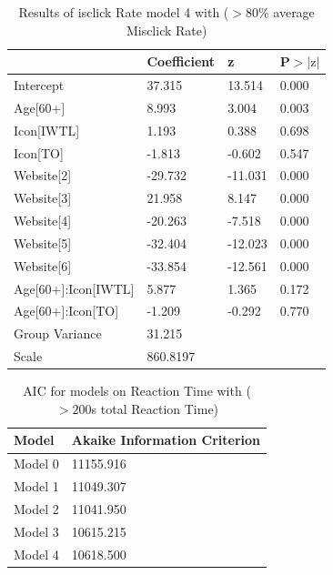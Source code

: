 \documentclass[12pt,twoside]{reedthesis}
\begin{document}
\begin{table}[h!]
        \centering
        \begin{tabular}{| p{5cm} | p{2.5cm} | p{2.5cm} | p{2.5cm} |}
            \hline
            & Coefficient & z & P$>|\text{z}|$\\
            \hline
            Intercept & 37.315 & 13.514 & 0.000\\
            \hline
            Age[60+] & 8.993 & 3.004 & 0.003\\
            \hline
            Icon[IWTL] & 1.193 & 0.388 & 0.698\\
            \hline
            Icon[TO] & -1.813 & -0.602 & 0.547\\
            \hline
            Website[2] & -29.732 & -11.031 & 0.000\\
            \hline
            Website[3] & 21.958 & 8.147 & 0.000\\
            \hline
            Website[4] & -20.263 & -7.518 & 0.000\\
            \hline
            Website[5] & -32.404 & -12.023 & 0.000\\
            \hline
            Website[6] & -33.854 & -12.561 & 0.000\\
            \hline
            Age[60+]:Icon[IWTL] & 5.877 & 1.365 & 0.172\\
            \hline
            Age[60+]:Icon[TO] & -1.209 & -0.292 & 0.770\\
            \hline
            Group Variance & 31.215 &&\\
            \hline
            Scale & 860.8197 &&\\
            \hline
        \end{tabular}
        \caption{Results of isclick Rate model 4 with ($>80$\% average Misclick Rate)}
    \end{table}

\begin{table}[h!]
        \centering
        \begin{tabular}{| p{3.5cm} | p{7.5cm} |}
            \hline
            Model & Akaike Information Criterion\\
            \hline
            Model 0 & 11155.916\\
            \hline
            Model 1 & 11049.307\\
            \hline
            Model 2 & 11041.950\\
            \hline
            Model 3 & 10615.215\\
            \hline
            Model 4 & 10618.500\\
            \hline
        \end{tabular}
        \caption{AIC for models on Reaction Time with ($>200$s total Reaction Time)}
    \end{table}
\end{document}
